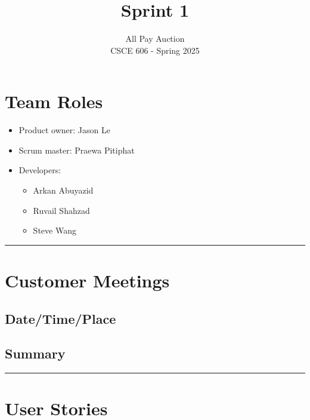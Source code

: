 \documentclass[10pt]{article}
\begin{document}
 
\title{Sprint 1}
\author{All Pay Auction\\
CSCE 606 - Spring 2025}
\maketitle

\section{Team Roles}
\begin{itemize}
    \item Product owner: Jason Le 
    \item Scrum master: Praewa Pitiphat
    \item Developers:
        \begin{itemize}
            \item Arkan Abuyazid
            \item Ruvail Shahzad 
            \item Steve Wang 
        \end{itemize}
\end{itemize}

\noindent\rule{8cm}{0.4pt} %
\section{Customer Meetings}

\subsection{Date/Time/Place}



\subsection{Summary}


\noindent\rule{8cm}{0.4pt} %
\section{User Stories}
\end{document}
